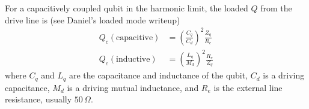 
For a capacitively coupled qubit in the harmonic limit, the loaded $Q$ from the drive line is (see Daniel's loaded mode writeup)
\begin{align*}
  Q_c (\text{capacitive}) &= \left( \frac{C_q}{C_d} \right)^2 \frac{Z_q}{R_e} \\
  Q_c (\text{inductive}) &= \left( \frac{L_q}{M_d} \right)^2 \frac{R_e}{Z_q}
\end{align*}
where $C_q$ and $L_q$ are the capacitance and inductance of the qubit, $C_d$ is a driving capacitance, $M_d$ is a driving mutual inductance, and $R_e$ is the external line resistance, usually $50 \, \Omega$.
